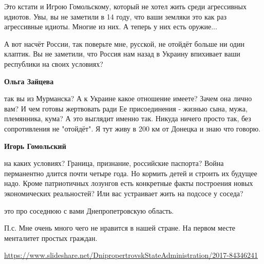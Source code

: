 \begin{itemize}
\begin{itemize}
Это кстати и Игрою Гомольскому, который не хотел жить среди агрессивных
идиотов. Увы, вы не заметили в 14 году, что ваши земляки это как раз
агрессивные идиоты. Многие из них. А теперь у них есть оружие...

А вот насчёт России, так поверьте мне, русской, не отойдёт больше ни один
клаптик. Вы не заметили, что Россия нам назад в Украину впихивает ваши
республики на своих условиях?

\textbf{Ольга Зайцева} 

так вы из Мурманска? А к Украине какое отношение имеете? Зачем она лично вам? И
чем готовы жертвовать ради Ее присоединения - жизнью сына, мужа, племянника,
кума? А это выглядит именно так. Никуда ничего просто так, без сопротивления не
"отойдёт". Я тут живу в 200 км от Донецка и знаю что говорю.

\textbf{Игорь Гомольский} 

на каких условиях? Граница, признание, российские паспорта? Война перманентно
длится почти четыре года. Но кормить детей и строить их будущее надо. Кроме
патриотичных лозунгов есть конкретные факты построения новых экономических
реальностей? Или вас устраивает жить на подсосе у соседа?


это про соседнюю с вами Днепропетровскую область.

П.с. Мне очень много чего не нравится в нашей стране. На первом месте
менталитет простых граждан.

\url{https://www.slideshare.net/DnipropertrovskStateAdministration/2017-84346241}

\end{itemize} %

\end{itemize} %
